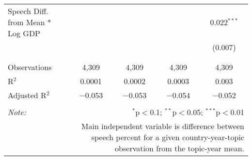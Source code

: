 \begin{table}[!htbp]
\begin{tabular}{@{\extracolsep{5pt}}lcccc}
 Speech Diff. from Mean * Log GDP &  &  &  & 0.022$^{***}$ \\ 
  &  &  &  & (0.007) \\ 
  & & & & \\ 
\hline \\[-1.8ex] 
Observations & 4,309 & 4,309 & 4,309 & 4,309 \\ 
R$^{2}$ & 0.0001 & 0.0002 & 0.0003 & 0.003 \\ 
Adjusted R$^{2}$ & $-$0.053 & $-$0.053 & $-$0.054 & $-$0.052 \\ 
\hline 
\hline \\[-1.8ex] 
\textit{Note:}  & \multicolumn{4}{r}{$^{*}$p$<$0.1; $^{**}$p$<$0.05; $^{***}$p$<$0.01} \\ 
 & \multicolumn{4}{r}{Main independent variable is difference between speech percent for a given country-year-topic observation from the topic-year mean.} \\ 
\end{tabular} 
\end{table} 
